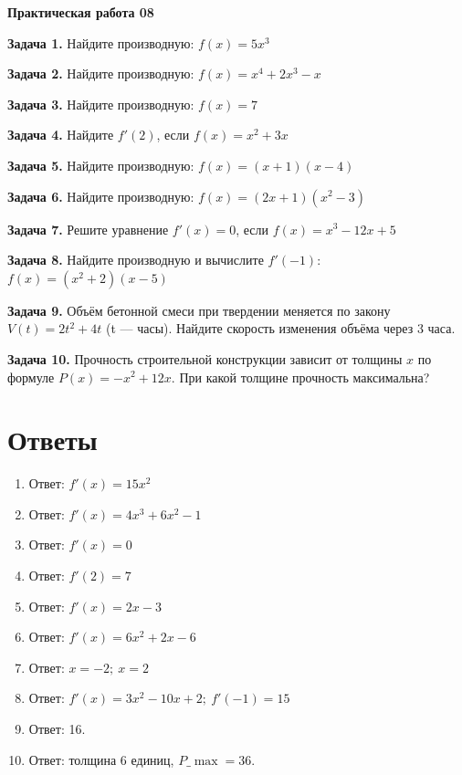 \documentclass{umk-matematika}
\begin{document}
\begin{center}
{\Large\bfseries Практическая работа 08}
\end{center}
\vspace{0.5cm}

\textbf{Задача 1.} Найдите производную: $f(x) = 5x^3$\par\vspace{10pt}
\textbf{Задача 2.} Найдите производную: $f(x) = x^4 + 2x^3 - x$\par\vspace{10pt}
\textbf{Задача 3.} Найдите производную: $f(x) = 7$\par\vspace{10pt}
\textbf{Задача 4.} Найдите $f'(2)$, если $f(x) = x^2 + 3x$\par\vspace{10pt}
\textbf{Задача 5.} Найдите производную: $f(x) = (x + 1)(x - 4)$\par\vspace{10pt}
\textbf{Задача 6.} Найдите производную: $f(x) = (2x + 1)(x^2 - 3)$\par\vspace{10pt}
\textbf{Задача 7.} Решите уравнение $f'(x) = 0$, если $f(x) = x^3 - 12x + 5$\par\vspace{10pt}
\textbf{Задача 8.} Найдите производную и вычислите $f'(-1)$: $f(x) = (x^2 + 2)(x - 5)$\par\vspace{10pt}
\textbf{Задача 9.} Объём бетонной смеси при твердении меняется по закону $V(t) = 2t^2 + 4t$ (t — часы). Найдите скорость изменения объёма через 3 часа.\par\vspace{10pt}
\textbf{Задача 10.} Прочность строительной конструкции зависит от толщины $x$ по формуле $P(x) = -x^2 + 12x$. При какой толщине прочность максимальна?\par\vspace{10pt}
\newpage
\section*{Ответы}

\begin{enumerate}
  \item Ответ: $f'(x) = 15x^2$
  \item Ответ: $f'(x) = 4x^3 + 6x^2 - 1$
  \item Ответ: $f'(x) = 0$
  \item Ответ: $f'(2) = 7$
  \item Ответ: $f'(x) = 2x - 3$
  \item Ответ: $f'(x) = 6x^2 + 2x - 6$
  \item Ответ: $x = -2;\ x = 2$
  \item Ответ: $f'(x) = 3x^2 - 10x + 2;\ f'(-1) = 15$
  \item Ответ: 16.
  \item Ответ: толщина 6 единиц, $P\_{\max} = 36$.
\end{enumerate}
\end{document}
